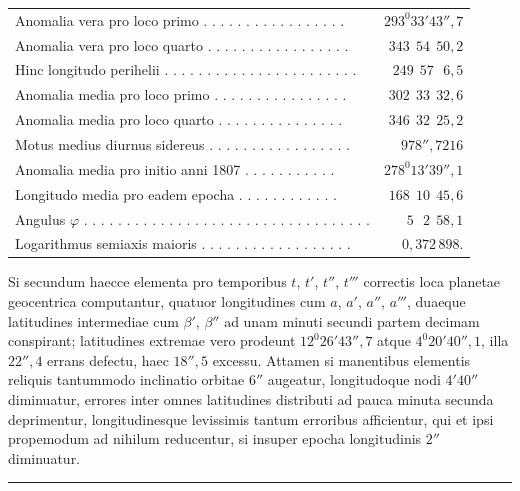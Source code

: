 \begin{center}
\begingroup\fontsize{9}{11}\selectfont\setlength{\tabcolsep}{3pt}
\begin{tabular}{@{}lr@{}}
Anomalia vera pro loco primo . . . . . . . . . . . . . . . . . & $293^{0}33'43''{,}7$ \\
Anomalia vera pro loco quarto . . . . . . . . . . . . . . . . . & $343\ \ 54\ \ 50{,}2$ \\
Hinc longitudo perihelii . . . . . . . . . . . . . . . . . . . . . . . & $249\ \ 57\ \ \ 6{,}5$ \\
Anomalia media pro loco primo . . . . . . . . . . . . . . . . & $302\ \ 33\ \ 32{,}6$ \\
Anomalia media pro loco quarto . . . . . . . . . . . . . . . & $346\ \ 32\ \ 25{,}2$ \\
Motus medius diurnus sidereus . . . . . . . . . . . . . . . . . & $978''{,}7216$ \\
Anomalia media pro initio anni 1807 . . . . . . . . . . . & $278^{0}13'39''{,}1$ \\
Longitudo media pro eadem epocha . . . . . . . . . . . . & $168\ \ 10\ \ 45{,}6$ \\
Angulus $\varphi$ . . . . . . . . . . . . . . . . . . . . . . . . . . . . . . . . . . & $5\ \ \ 2\ \ 58{,}1$ \\
Logarithmus semiaxis maioris . . . . . . . . . . . . . . . . . . & $0{,}372\,898.$
\end{tabular}\endgroup
\end{center}

Si secundum haecce elementa pro temporibus $t$, $t'$, $t''$, $t'''$ correctis
loca planetae geocentrica computantur, quatuor longitudines cum $a$, $a'$,
$a''$, $a'''$, duaeque latitudines intermediae cum $\beta'$, $\beta''$ ad
unam minuti secundi partem decimam conspirant; latitudines extremae vero
prodeunt $12^{0}26'43''{,}7$ atque $4^{0}20'40''{,}1$, illa $22''{,}4$ errans
defectu, haec $18''{,}5$ excessu. Attamen si manentibus elementis reliquis
tantummodo inclinatio orbitae $6''$ augeatur, longitudoque nodi $4' 40''$
diminuatur, errores inter omnes latitudines distributi ad pauca minuta
secunda deprimentur, longitudinesque levissimis tantum erroribus
afficientur, qui et ipsi propemodum ad nihilum reducentur, si insuper
epocha longitudinis $2''$ diminuatur.
\par\medskip\begin{center}\rule{.24\linewidth}{.35pt}\end{center}
